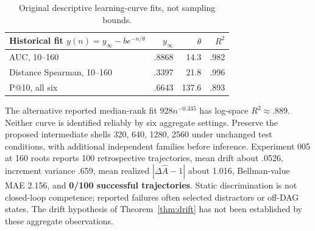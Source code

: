 \documentclass[11pt]{article}
\theoremstyle{definition}\newtheorem{definition}[theorem]{Definition}\newtheorem{example}[theorem]{Example}\newtheorem{conjecture}[theorem]{Conjecture}
\begin{document}
\begin{table}[ht]\centering\small
\begin{tabular}{lrrr}\toprule Historical fit $y(n)=y_\infty-be^{-n/\theta}$ &$y_\infty$&$\theta$&$R^2$\\\midrule
AUC, 10--160&.8868&14.3&.982\\Distance Spearman, 10--160&.3397&21.8&.996\\P@10, all six&.6643&137.6&.893\\\bottomrule\end{tabular}
\caption{Original descriptive learning-curve fits, not sampling bounds.}\end{table}
The alternative reported median-rank fit $928n^{-0.335}$ has log-space $R^2\approx .889$. Neither curve is identified reliably by six aggregate settings. Preserve the proposed intermediate shells 320, 640, 1280, 2560 under unchanged test conditions, with additional independent families before inference. Experiment 005 at 160 roots reports 100 retrospective trajectories, mean drift about .0526, increment variance .659, mean realized $|\Delta\widehat A-1|$ about 1.016, Bellman-value MAE 2.156, and \textbf{0/100 successful trajectories}. Static discrimination is not closed-loop competence; reported failures often selected distractors or off-DAG states. The drift hypothesis of Theorem~\ref{thm:drift} has not been established by these aggregate observations.
\end{document}
